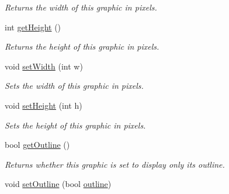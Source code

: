 \begin{DoxyCompactItemize}
\begin{DoxyCompactList}\small\item\em Returns the width of this graphic in pixels. \end{DoxyCompactList}\item 
\hypertarget{class_picto_1_1_ellipse_graphic_a54c7e311f42f25427241b7f5648cf53c}{int \hyperlink{class_picto_1_1_ellipse_graphic_a54c7e311f42f25427241b7f5648cf53c}{get\-Height} ()}\label{class_picto_1_1_ellipse_graphic_a54c7e311f42f25427241b7f5648cf53c}

\begin{DoxyCompactList}\small\item\em Returns the height of this graphic in pixels. \end{DoxyCompactList}\item 
\hypertarget{class_picto_1_1_ellipse_graphic_ab0158318a98bc35b5e68fc1e4040996d}{void \hyperlink{class_picto_1_1_ellipse_graphic_ab0158318a98bc35b5e68fc1e4040996d}{set\-Width} (int w)}\label{class_picto_1_1_ellipse_graphic_ab0158318a98bc35b5e68fc1e4040996d}

\begin{DoxyCompactList}\small\item\em Sets the width of this graphic in pixels. \end{DoxyCompactList}\item 
\hypertarget{class_picto_1_1_ellipse_graphic_a51794984e82410ba38df6604e9eef7cb}{void \hyperlink{class_picto_1_1_ellipse_graphic_a51794984e82410ba38df6604e9eef7cb}{set\-Height} (int h)}\label{class_picto_1_1_ellipse_graphic_a51794984e82410ba38df6604e9eef7cb}

\begin{DoxyCompactList}\small\item\em Sets the height of this graphic in pixels. \end{DoxyCompactList}\item 
\hypertarget{class_picto_1_1_ellipse_graphic_afc9cc6adf28be3b9f03431773c51901e}{bool \hyperlink{class_picto_1_1_ellipse_graphic_afc9cc6adf28be3b9f03431773c51901e}{get\-Outline} ()}\label{class_picto_1_1_ellipse_graphic_afc9cc6adf28be3b9f03431773c51901e}

\begin{DoxyCompactList}\small\item\em Returns whether this graphic is set to display only its outline. \end{DoxyCompactList}\item 
\hypertarget{class_picto_1_1_ellipse_graphic_a46982ef506b664a067e260d6de15f635}{void \hyperlink{class_picto_1_1_ellipse_graphic_a46982ef506b664a067e260d6de15f635}{set\-Outline} (bool \hyperlink{class_picto_1_1_ellipse_graphic_a84e8f8ac17d8be8172ce09c5a647ca93}{outline})}\label{class_picto_1_1_ellipse_graphic_a46982ef506b664a067e260d6de15f635}


\end{DoxyCompactItemize}
